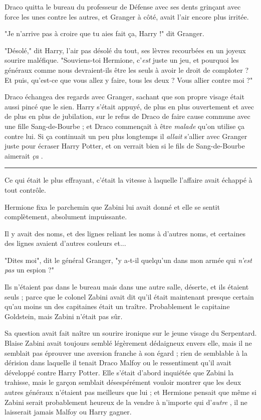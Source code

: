 Draco quitta le bureau du professeur de Défense avec ses dents grinçant avec force les unes contre les autres, et Granger à côté, avait l'air encore plus irritée.

"Je n'arrive pas à croire que tu aies fait ça, Harry !" dit Granger.

"Désolé," dit Harry, l'air pas désolé du tout, ses lèvres recourbées en un joyeux sourire maléfique. "Souviens-toi Hermione, c'\emph{est}  juste un jeu, et pourquoi les généraux comme nous devraient-ils être les seuls à avoir le droit de comploter ? Et puis, qu'est-ce que vous allez y faire, tous les deux ? Vous allier contre moi ?"

Draco échangea des regards avec Granger, sachant que son propre visage était aussi pincé que le sien. Harry s'était appuyé, de plus en plus ouvertement et avec de plus en plus de jubilation, sur le refus de Draco de faire cause commune avec une fille Sang-de-Bourbe ; et Draco commençait à être \emph{malade}  qu'on utilise ça contre lui. Si ça continuait un peu plus longtemps il \emph{allait}  s'allier avec Granger juste pour écraser Harry Potter, et on verrait bien si le fils de Sang-de-Bourbe aimerait \emph{ça} .
\par\noindent\rule{\textwidth}{0.4pt}
Ce qui était le plus effrayant, c'était la vitesse à laquelle l'affaire avait échappé à tout contrôle.

Hermione fixa le parchemin que Zabini lui avait donné et elle se sentit complètement, absolument impuissante.

Il y avait des noms, et des lignes reliant les noms à d'autres noms, et certaines des lignes avaient d'autres couleurs et...

"Dites moi", dit le général Granger, "y a-t-il quelqu'un dans mon armée qui \emph{n'est pas}  un espion ?"

Ils n'étaient pas dans le bureau mais dans une autre salle, déserte, et ils étaient seuls ; parce que le colonel Zabini avait dit qu'il était maintenant presque certain qu'au moins un des capitaines était un traître. Probablement le capitaine Goldstein, mais Zabini n'était pas sûr.

Sa question avait fait naître un sourire ironique sur le jeune visage du Serpentard. Blaise Zabini avait toujours semblé légèrement dédaigneux envers elle, mais il ne semblait pas éprouver une aversion franche à son égard ; rien de semblable à la dérision dans laquelle il tenait Draco Malfoy ou le ressentiment qu'il avait développé contre Harry Potter. Elle s'était d'abord inquiétée que Zabini la trahisse, mais le garçon semblait désespérément vouloir montrer que les deux autres généraux n'étaient pas meilleurs que lui ; et Hermione pensait que même si Zabini serait probablement heureux de la vendre à n'importe qui d'\emph{autre} , il ne laisserait jamais Malfoy ou Harry gagner.

